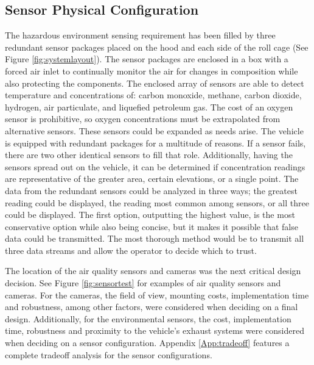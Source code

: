 \subsection{Sensor Physical Configuration}
The hazardous environment sensing requirement has been filled by three redundant sensor packages placed on the hood and each side of the roll cage (See Figure \ref{fig:systemlayout}). The sensor packages  are enclosed in a box with a forced air inlet to continually monitor the air for changes in composition while also protecting the components. The enclosed array of sensors are able to detect temperature and concentrations of: carbon monoxide, methane, carbon dioxide, hydrogen, air particulate, and liquefied petroleum gas. The cost of an oxygen sensor is prohibitive, so oxygen concentrations must be extrapolated from alternative sensors. These sensors could be expanded as needs arise. The vehicle is equipped with redundant packages for a multitude of reasons. If a sensor fails, there are two other identical sensors to fill that role. Additionally, having the sensors spread out on the vehicle, it can be determined if concentration readings are representative of the greater area, certain elevations, or a single point. The data from the redundant sensors could be analyzed in three ways; the greatest reading could be displayed, the reading most common among sensors, or all three could be displayed. The first option, outputting the highest value, is the most conservative option while also being concise, but it makes it possible that false data could be transmitted. The most thorough method would be to transmit all three data streams and allow the operator to decide which to trust. 

The location of the air quality sensors and cameras was the next critical design decision. See Figure \ref{fig:sensortest} for examples of air quality sensors and cameras. For the cameras, the field of view, mounting costs, implementation time and robustness, among other factors, were considered when deciding on a final design. Additionally, for the environmental sensors, the cost, implementation time, robustness and proximity to the vehicle's exhaust systems were considered when deciding on a sensor configuration. Appendix \ref{App:tradeoff} features a complete tradeoff analysis for the sensor configurations. 

